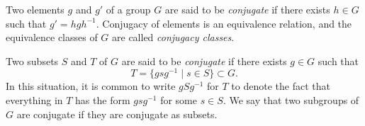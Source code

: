 \documentclass{article}
\begin{document}
Two elements $g$ and $g'$ of a group $G$ are said to be {\em conjugate} if there exists $h \in G$ such that $g' = hgh^{-1}$. Conjugacy of elements is an equivalence relation, and the equivalence classes of $G$ are called {\em conjugacy classes}.

Two subsets $S$ and $T$ of $G$ are said to be {\em conjugate} if there exists $g \in G$ such that
$$
T = \{gsg^{-1} \mid s \in S\} \subset G.
$$
In this situation, it is common to write $gSg^{-1}$ for $T$ to denote the fact that everything in $T$ has the form $gsg^{-1}$ for some $s \in S$. We say that two subgroups of $G$ are conjugate if they are conjugate as subsets.
\end{document}
